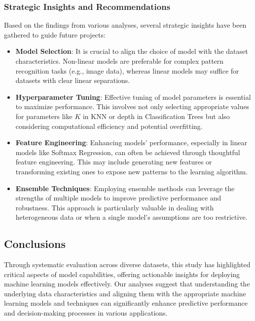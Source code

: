 \documentclass[letterpaper,10pt]{article}
\begin{document}
\subsubsection{Strategic Insights and Recommendations}

Based on the findings from various analyses, several strategic insights have been gathered to guide future projects:
\begin{itemize}
    \item \textbf{Model Selection}: It is crucial to align the choice of model with the dataset characteristics. Non-linear models are preferable for complex pattern recognition tasks (e.g., image data), whereas linear models may suffice for datasets with clear linear separations.
    
    \item \textbf{Hyperparameter Tuning}: Effective tuning of model parameters is essential to maximize performance. This involves not only selecting appropriate values for parameters like $K$ in KNN or depth in Classification Trees but also considering computational efficiency and potential overfitting.
    
    \item \textbf{Feature Engineering}: Enhancing models' performance, especially in linear models like Softmax Regression, can often be achieved through thoughtful feature engineering. This may include generating new features or transforming existing ones to expose new patterns to the learning algorithm.
    
    \item \textbf{Ensemble Techniques}: Employing ensemble methods can leverage the strengths of multiple models to improve predictive performance and robustness. This approach is particularly valuable in dealing with heterogeneous data or when a single model's assumptions are too restrictive.
\end{itemize}

\subsection{Conclusions}

Through systematic evaluation across diverse datasets, this study has highlighted critical aspects of model capabilities, offering actionable insights for deploying machine learning models effectively. Our analyses suggest that understanding the underlying data characteristics and aligning them with the appropriate machine learning models and techniques can significantly enhance predictive performance and decision-making processes in various applications.
\end{document}
